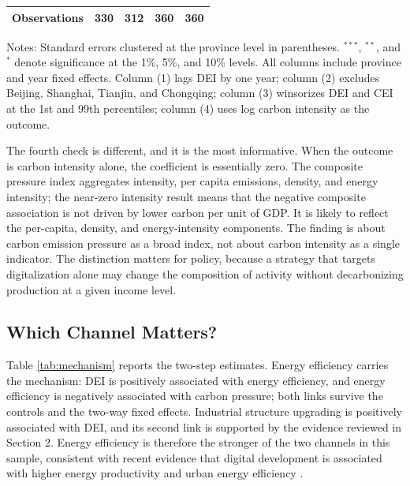\documentclass[economies,article,submit,moreauthors]{Definitions/mdpi}
\begin{document}
\begin{table}[!htbp]
\begin{threeparttable}
\begin{tabular}{lcccc}
Observations & 330 & 312 & 360 & 360\\
\bottomrule
\end{tabular}
\begin{tablenotes}\footnotesize
\item Notes: Standard errors clustered at the province level in parentheses. $^{***}$, $^{**}$, and $^{*}$ denote significance at the 1\%, 5\%, and 10\% levels. All columns include province and year fixed effects. Column (1) lags DEI by one year; column (2) excludes Beijing, Shanghai, Tianjin, and Chongqing; column (3) winsorizes DEI and CEI at the 1st and 99th percentiles; column (4) uses log carbon intensity as the outcome.
\end{tablenotes}
\end{threeparttable}
\end{table}

The fourth check is different, and it is the most informative. When the outcome is carbon intensity alone, the coefficient is essentially zero. The composite pressure index aggregates intensity, per capita emissions, density, and energy intensity; the near-zero intensity result means that the negative composite association is not driven by lower carbon per unit of GDP. It is likely to reflect the per-capita, density, and energy-intensity components. The finding is about carbon emission pressure as a broad index, not about carbon intensity as a single indicator. The distinction matters for policy, because a strategy that targets digitalization alone may change the composition of activity without decarbonizing production at a given income level.

\subsection{Which Channel Matters?}

Table \ref{tab:mechanism} reports the two-step estimates. Energy efficiency carries the mechanism: DEI is positively associated with energy efficiency, and energy efficiency is negatively associated with carbon pressure; both links survive the controls and the two-way fixed effects. Industrial structure upgrading is positively associated with DEI, and its second link is supported by the evidence reviewed in Section 2. Energy efficiency is therefore the stronger of the two channels in this sample, consistent with recent evidence that digital development is associated with higher energy productivity and urban energy efficiency \citep{ma2024,wang2025energy}.
\end{document}
